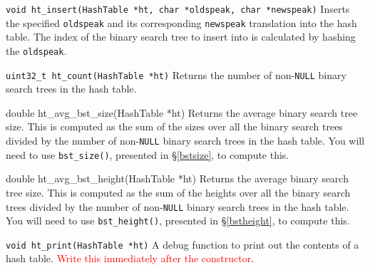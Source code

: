 \begin{funcdoc}{\texttt{void ht\_insert(HashTable *ht, char *oldspeak, char *newspeak)}}
  Inserts the specified \texttt{oldspeak} and its corresponding
  \texttt{newspeak} translation into the hash table. The index of the
  binary search tree to insert into is calculated by hashing the
  \texttt{oldspeak}.
\end{funcdoc}

\begin{funcdoc}{\texttt{uint32\_t ht\_count(HashTable *ht)}}
Returns the number of non-\texttt{NULL} binary search trees in the hash
table.
\end{funcdoc}

\begin{funcdoc}{double ht\_avg\_bst\_size(HashTable *ht)}
  Returns the average binary search tree size. This is computed as the
  sum of the sizes over all the binary search trees divided by the
  number of non-\texttt{NULL} binary search trees in the hash table. You
  will need to use \texttt{bst\_size()}, presented in \S\ref{bstsize},
  to compute this.
\end{funcdoc}

\begin{funcdoc}{double ht\_avg\_bst\_height(HashTable *ht)}
  Returns the average binary search tree size. This is computed as the
  sum of the heights over all the binary search trees divided by the
  number of non-\texttt{NULL} binary search trees in the hash table. You
  will need to use \texttt{bst\_height()}, presented in
  \S\ref{bstheight}, to compute this.
\end{funcdoc}

\begin{funcdoc}{\texttt{void ht\_print(HashTable *ht)}}
  A debug function to print out the contents of a hash table.
  \textcolor{red}{Write this immediately after the constructor}.
\end{funcdoc}
